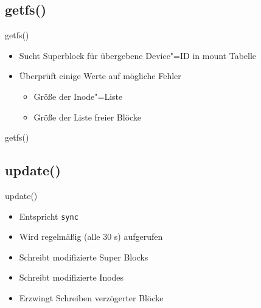 \documentclass{beamer}
\begin{document}


\subsection{getfs()}

\begin{frame}{getfs()}
    \begin{itemize}
        \item Sucht Superblock für übergebene Device"=ID in mount Tabelle

        \bigskip

        \item Überprüft einige Werte auf mögliche Fehler
            \begin{itemize}
                \item Größe der Inode"=Liste
                \item Größe der Liste freier Blöcke
            \end{itemize}
    \end{itemize}
\end{frame}

\begin{frame}{getfs()}
\end{frame}




\subsection{update()}

\begin{frame}{update()}
    \begin{itemize}
        \item Entspricht \texttt{sync}
        \item Wird regelmäßig (alle 30 s) aufgerufen

        \bigskip

        \item Schreibt modifizierte Super Blocks
        \item Schreibt modifizierte Inodes
        \item Erzwingt Schreiben verzögerter Blöcke
    \end{itemize}
\end{frame}
\end{document}
